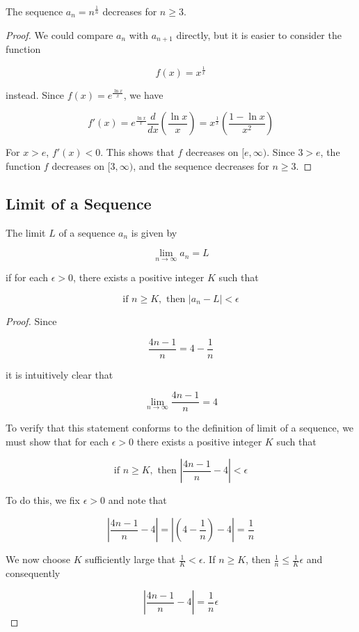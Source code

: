         \textit{} The sequence $a_n = n^{\frac{1}{n}}$ decreases for $n \geq 3$.

        \begin{proof}
            We could compare $a_n$ with $a_{n+1}$ directly, but it is easier to consider the function

            \[
                f(x) = x^{\frac{1}{x}}
            \]

            instead. Since $f(x) = e^{\frac{\ln{x}}{x}}$, we have

            \[
                f'(x) = e^{\frac{\ln{x}}{x}} \frac{d}{dx}\left(\frac{\ln{x}}{x}\right) = x^{\frac{1}{x}} \left(\frac{1-\ln{x}}{x^2}\right)
            \]

            For $x > e$, $f'(x) < 0$. This shows that $f$ decreases on $[e, \infty)$. Since $3 > e$, the function $f$ decreases on $[3, \infty)$, and the sequence decreases for $n \geq 3$.
        \end{proof}

    \subsection{Limit of a Sequence}        %

        The limit $L$ of a sequence $a_n$ is given by

        \[
            \lim_{n \to \infty} a_n = L
        \]

        if for each $\epsilon > 0$, there exists a positive integer $K$ such that

        \[
            \text{if } n \geq K, \text{ then } |a_n - L| < \epsilon
        \]

        \textit{}

        \begin{proof}
            Since

            \[
                \frac{4n-1}{n} = 4 - \frac{1}{n}
            \]

            it is intuitively clear that

            \[
                \lim_{n\to \infty} \frac{4n-1}{n} = 4
            \]

            To verify that this statement conforms to the definition of limit of a sequence, we must show that for each $\epsilon > 0$ there exists a positive integer $K$ such that

            \[
                \text{if } n \geq K, \text{ then } \left|\frac{4n-1}{n} - 4\right| < \epsilon
            \]

            To do this, we fix $\epsilon > 0$ and note that

            \[
                \left|\frac{4n-1}{n} - 4\right| = \left|\left(4 - \frac{1}{n}\right) - 4\right| = \frac{1}{n}
            \]

            We now choose $K$ sufficiently large that $\frac{1}{K} < \epsilon$. If $n \geq K$, then $\frac{1}{n} \leq \frac{1}{K} \epsilon$ and consequently

            \[
                \left| \frac{4n-1}{n} - 4\right| = \frac{1}{n} \epsilon
            \]
        \end{proof}

